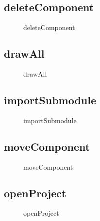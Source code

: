 \documentclass[12pt]{article}
\begin{document}
    \subsection{deleteComponent}
    \begin{figure}[H]
        \centering
        
        \caption{deleteComponent}
    \end{figure}

    \subsection{drawAll}
    \begin{figure}[H]
        \centering
        
        \caption{drawAll}
    \end{figure}


    \subsection{importSubmodule}
    \begin{figure}[H]
        \centering
        
        \caption{importSubmodule}
    \end{figure}


    \subsection{moveComponent}
    \begin{figure}[H]
        \centering
        
        \caption{moveComponent}
    \end{figure}


    \subsection{openProject}
    \begin{figure}[H]
        \centering
        
        \caption{openProject}
    \end{figure}
\end{document}
